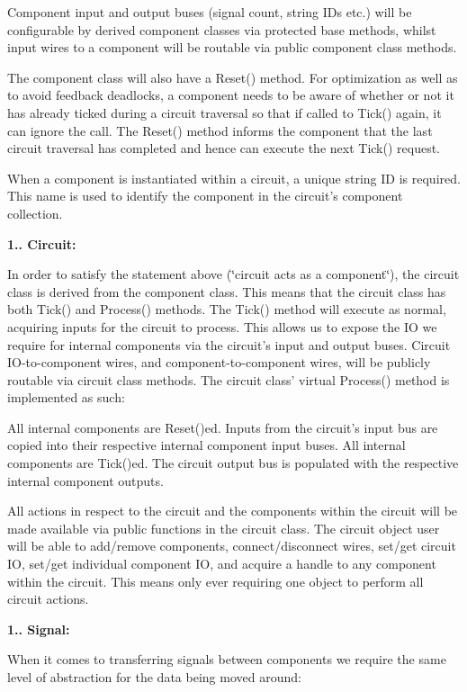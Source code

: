 Component input and output buses (signal count, string I\-Ds etc.) will be configurable by derived component classes via protected base methods, whilst input wires to a component will be routable via public component class methods.

The component class will also have a Reset() method. For optimization as well as to avoid feedback deadlocks, a component needs to be aware of whether or not it has already ticked during a circuit traversal so that if called to Tick() again, it can ignore the call. The Reset() method informs the component that the last circuit traversal has completed and hence can execute the next Tick() request.

When a component is instantiated within a circuit, a unique string I\-D is required. This name is used to identify the component in the circuit's component collection.

{\bfseries 1.. Circuit\-:}

In order to satisfy the statement above (\char`\"{}circuit acts as a component\char`\"{}), the circuit class is derived from the component class. This means that the circuit class has both Tick() and Process() methods. The Tick() method will execute as normal, acquiring inputs for the circuit to process. This allows us to expose the I\-O we require for internal components via the circuit's input and output buses. Circuit I\-O-\/to-\/component wires, and component-\/to-\/component wires, will be publicly routable via circuit class methods. The circuit class' virtual Process() method is implemented as such\-:

All internal components are Reset()ed. Inputs from the circuit's input bus are copied into their respective internal component input buses. All internal components are Tick()ed. The circuit output bus is populated with the respective internal component outputs.

All actions in respect to the circuit and the components within the circuit will be made available via public functions in the circuit class. The circuit object user will be able to add/remove components, connect/disconnect wires, set/get circuit I\-O, set/get individual component I\-O, and acquire a handle to any component within the circuit. This means only ever requiring one object to perform all circuit actions.

{\bfseries 1.. Signal\-:}

When it comes to transferring signals between components we require the same level of abstraction for the data being moved around\-:


